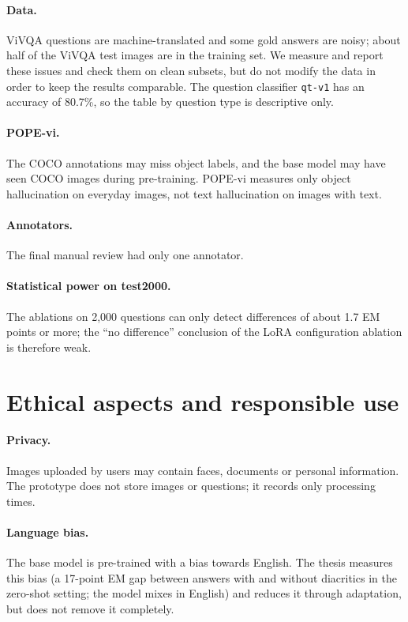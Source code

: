 \paragraph{Data.} ViVQA questions are machine-translated and some gold answers are noisy;
about half of the ViVQA test images are in the training set. We measure and report
these issues and check them on clean subsets, but do not modify the data in order to keep the
results comparable. The question classifier \texttt{qt-v1} has an accuracy of 80.7\%, so the
table by question type is descriptive only.

\paragraph{POPE-vi.} The COCO annotations may miss object labels, and the base model may have
seen COCO images during pre-training. POPE-vi measures only object hallucination on everyday
images, not text hallucination on images with text.

\paragraph{Annotators.} The final manual review had only one annotator.

\paragraph{Statistical power on test2000.} The ablations on 2,000 questions can only detect
differences of about 1.7 EM points or more; the ``no difference'' conclusion of the LoRA
configuration ablation is therefore weak.

\section{Ethical aspects and responsible use}
\label{sec:dis-ethics}

\paragraph{Privacy.} Images uploaded by users may contain faces, documents or personal
information. The prototype does not store images or questions; it records only processing
times.

\paragraph{Language bias.} The base model is pre-trained with a bias towards English. The
thesis measures this bias (a 17-point EM gap between answers with and without diacritics in
the zero-shot setting; the model mixes in English) and reduces it through adaptation, but
does not remove it completely.

